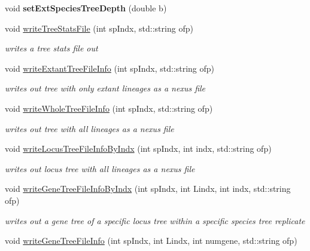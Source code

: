 \begin{DoxyCompactItemize}
\item 
\mbox{\label{class_tree_info_a29b70b3fb063fecbefde61da373dfef4}} 
void {\bfseries set\+Ext\+Species\+Tree\+Depth} (double b)
\item 
void \mbox{\hyperlink{class_tree_info_a022d5d76bffb9712d31c081925bfab46}{write\+Tree\+Stats\+File}} (int sp\+Indx, std\+::string ofp)
\begin{DoxyCompactList}\small\item\em writes a tree stats file out \end{DoxyCompactList}\item 
void \mbox{\hyperlink{class_tree_info_aabdbd68d218fcdd3b4e9d9044393123f}{write\+Extant\+Tree\+File\+Info}} (int sp\+Indx, std\+::string ofp)
\begin{DoxyCompactList}\small\item\em writes out tree with only extant lineages as a nexus file \end{DoxyCompactList}\item 
void \mbox{\hyperlink{class_tree_info_ae72e367c9d23a150e6f7b9dcda53d1f6}{write\+Whole\+Tree\+File\+Info}} (int sp\+Indx, std\+::string ofp)
\begin{DoxyCompactList}\small\item\em writes out tree with all lineages as a nexus file \end{DoxyCompactList}\item 
void \mbox{\hyperlink{class_tree_info_ae6ee15543dea722e8f32358398f2ef3b}{write\+Locus\+Tree\+File\+Info\+By\+Indx}} (int sp\+Indx, int indx, std\+::string ofp)
\begin{DoxyCompactList}\small\item\em writes out locus tree with all lineages as a nexus file \end{DoxyCompactList}\item 
void \mbox{\hyperlink{class_tree_info_a072518831dd34d1d933e1367283a4389}{write\+Gene\+Tree\+File\+Info\+By\+Indx}} (int sp\+Indx, int Lindx, int indx, std\+::string ofp)
\begin{DoxyCompactList}\small\item\em writes out a gene tree of a specific locus tree within a specific species tree replicate \end{DoxyCompactList}\item 
void \mbox{\hyperlink{class_tree_info_a17ecaff23a95f37356c51ddfa9453fbb}{write\+Gene\+Tree\+File\+Info}} (int sp\+Indx, int Lindx, int numgene, std\+::string ofp)

\end{DoxyCompactItemize}
